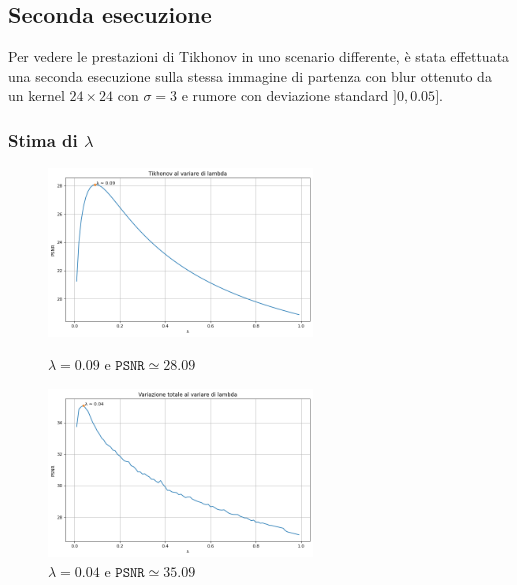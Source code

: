 \documentclass[11pt]{article}
\begin{document}
\subsection*{Seconda esecuzione}
Per vedere le prestazioni di Tikhonov in uno scenario differente, è stata effettuata una seconda esecuzione sulla stessa immagine di partenza con blur ottenuto da un kernel $24 \times 24$ con $\sigma=3$ e rumore con deviazione standard $]0, 0.05]$.

\subsubsection*{Stima di $\lambda$}
\begin{figure}[H]
    \centering
    \begin{minipage}{0.45\textwidth}
        \centering
        \includegraphics[width=7cm]{esecuzione/2/tikhonov_lambda.png}
        \caption{$\lambda=0.09$ e $\texttt{PSNR} \simeq 28.09$}
        \label{fig:tikhonov_lambda2}
    \end{minipage}\hfill
    \begin{minipage}{0.45\textwidth}
        \centering
        \includegraphics[width=7cm]{esecuzione/2/tv_lambda.png}
        \caption{$\lambda=0.04$ e $\texttt{PSNR} \simeq 35.09$}
        \label{fig:tv_lambda2}
    \end{minipage}
\end{figure}
\end{document}
